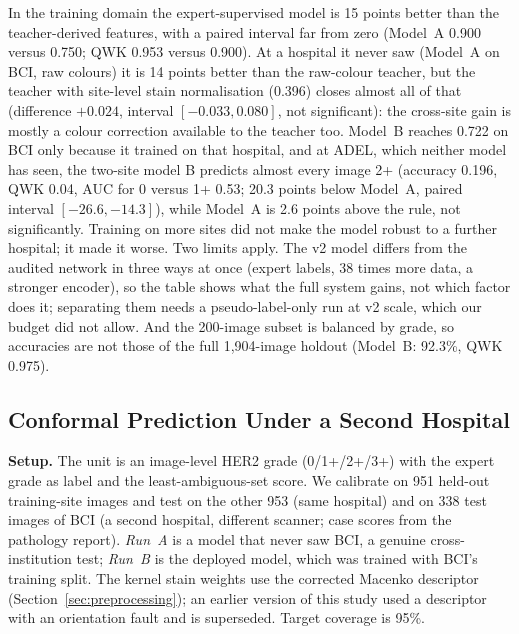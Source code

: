 \documentclass[conference]{IEEEtran}
\begin{document}
In the training domain the expert-supervised model is 15 points better than the teacher-derived features, with a paired interval far from zero (Model~A
0.900 versus 0.750; QWK 0.953 versus 0.900). At a hospital it never saw (Model~A on BCI, raw colours) it is 14 points better than the raw-colour teacher, but the
teacher with site-level stain normalisation (0.396) closes almost all of that (difference $+0.024$, interval $[-0.033,0.080]$, not significant): the cross-site
gain is mostly a colour correction available to the teacher too. Model~B reaches 0.722 on BCI only because it trained on that hospital, and at ADEL, which neither model has seen, the two-site model B predicts almost every image 2+
(accuracy 0.196, QWK 0.04, AUC for 0 versus 1+ 0.53; 20.3 points below Model~A, paired interval $[-26.6,-14.3]$), while Model~A is 2.6 points above the rule, not significantly. Training on more sites
did not make the model robust to a further hospital; it made it worse. Two limits apply. The v2 model differs from
the audited network in three ways at once (expert labels, 38 times more data, a stronger encoder), so the table shows what the full system gains, not which factor
does it; separating them needs a pseudo-label-only run at v2 scale, which our budget did not allow. And the 200-image subset is balanced by grade, so accuracies
are not those of the full 1{,}904-image holdout (Model~B: 92.3\%, QWK 0.975).

\subsection{Conformal Prediction Under a Second Hospital}
\label{sec:results-conformal}

\textbf{Setup.} The unit is an image-level HER2 grade (0/1+/2+/3+) with the
expert grade as label and the least-ambiguous-set score. We calibrate on 951
held-out training-site images and test on the other 953 (same hospital) and on
338 test images of BCI \cite{liu2022} (a second hospital, different scanner;
case scores from the pathology report). \emph{Run~A} is a model that never saw
BCI, a genuine cross-institution test; \emph{Run~B} is the deployed model,
which was trained with BCI's training split. The kernel stain weights use the
corrected Macenko descriptor (Section~\ref{sec:preprocessing}); an earlier
version of this study used a descriptor with an orientation fault and is
superseded. Target coverage is 95\%.
\end{document}
